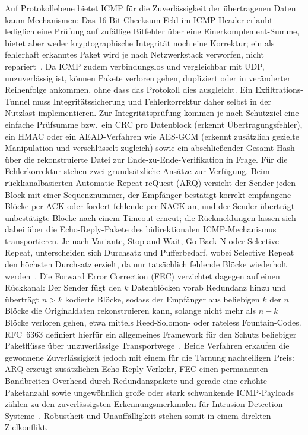 \documentclass[11pt,a4paper]{article}
\begin{document}
Auf Protokollebene bietet ICMP für die Zuverlässigkeit der übertragenen Daten
kaum Mechanismen: Das 16-Bit-Checksum-Feld im ICMP-Header erlaubt lediglich eine
Prüfung auf zufällige Bitfehler über eine Einerkomplement-Summe, bietet aber
weder kryptographische Integrität noch eine Korrektur; ein als fehlerhaft
erkanntes Paket wird je nach Netzwerkstack verworfen, nicht
repariert~\cite{rfc792}. Da ICMP zudem verbindungslos und vergleichbar mit
UDP, unzuverlässig ist, können Pakete verloren gehen, dupliziert oder in
veränderter Reihenfolge ankommen, ohne dass das Protokoll dies ausgleicht. Ein
Exfiltrations-Tunnel muss Integritätssicherung und Fehlerkorrektur daher selbst
in der Nutzlast implementieren. Zur Integritätsprüfung kommen je nach Schutzziel
eine einfache Prüfsumme bzw.\ ein CRC pro Datenblock (erkennt
Übertragungsfehler), ein HMAC oder ein AEAD-Verfahren wie AES-GCM (erkennt
zusätzlich gezielte Manipulation und verschlüsselt zugleich) sowie ein
abschließender Gesamt-Hash über die rekonstruierte Datei zur
Ende-zu-Ende-Verifikation in Frage. Für die Fehlerkorrektur stehen zwei
grundsätzliche Ansätze zur Verfügung. Beim rückkanalbasierten Automatic Repeat
reQuest (ARQ) versieht der Sender jeden Block mit einer Sequenznummer, der
Empfänger bestätigt korrekt empfangene Blöcke per ACK oder fordert fehlende per
NACK an, und der Sender überträgt unbestätigte Blöcke nach einem Timeout erneut;
die Rückmeldungen lassen sich dabei über die Echo-Reply-Pakete des
bidirektionalen ICMP-Mechanismus transportieren. Je nach Variante, Stop-and-Wait,
Go-Back-N oder Selective Repeat, unterscheiden sich Durchsatz und Pufferbedarf,
wobei Selective Repeat den höchsten Durchsatz erzielt, da nur tatsächlich
fehlende Blöcke wiederholt werden~\cite{lin1984arq}. Die Forward Error Correction
(FEC) verzichtet dagegen auf einen Rückkanal: Der Sender fügt den $k$
Datenblöcken vorab Redundanz hinzu und überträgt $n > k$ kodierte Blöcke, sodass
der Empfänger aus beliebigen $k$ der $n$ Blöcke die Originaldaten rekonstruieren
kann, solange nicht mehr als $n-k$ Blöcke verloren gehen, etwa mittels
Reed-Solomon- oder rateless Fountain-Codes. RFC~6363 definiert hierfür ein
allgemeines Framework für den Schutz beliebiger Paketflüsse über unzuverlässige
Transportwege~\cite{rfc6363}. Beide Verfahren erkaufen die gewonnene
Zuverlässigkeit jedoch mit einem für die Tarnung nachteiligen Preis: ARQ erzeugt
zusätzlichen Echo-Reply-Verkehr, FEC einen permanenten Bandbreiten-Overhead durch
Redundanzpakete und gerade eine erhöhte Paketanzahl sowie ungewöhnlich große
oder stark schwankende ICMP-Payloads zählen zu den zuverlässigsten
Erkennungsmerkmalen für Intrusion-Detection-Systeme~\cite{elastic}. Robustheit
und Unauffälligkeit stehen somit in einem direkten Zielkonflikt.
\end{document}
